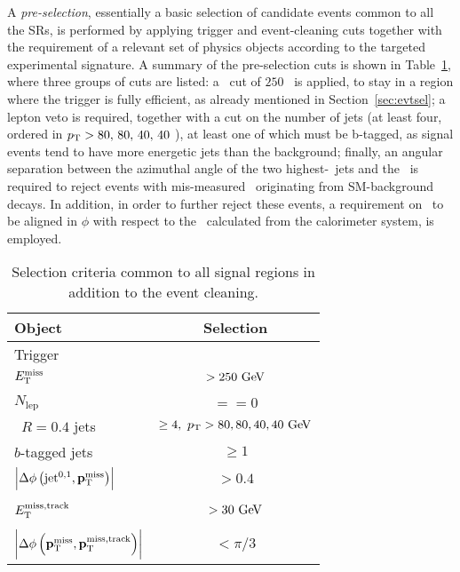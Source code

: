 			A \emph{pre-selection}, essentially a basic selection of candidate events common to all the \acp{SR}, is performed by applying trigger and event-cleaning cuts together with the requirement of a relevant set of physics objects according to the targeted experimental signature. A summary of the pre-selection cuts is shown in Table~\ref{tab:SRcommon}, where three groups of cuts are listed: a \met\ cut of $250$ \GeV\ is applied, to stay in a region where the trigger is fully efficient, as already mentioned in Section~\ref{sec:evtsel}; a lepton veto is required, together with a cut on the number of jets (at least four, ordered in $p_{\mathrm{T}} > 80,\,80,\,40,\,40$ \GeV), at least one of which must be b-tagged, as signal events tend to have more energetic jets than the background; finally, an angular separation between the azimuthal angle of the two highest-\pt\ jets and the \ptmiss\ is required to reject events with mis-measured \met\ originating from \ac{SM}-background decays. In addition, in order to further reject these events, a requirement on \ptmisstrk\ to be aligned in $\phi$ with respect to the \ptmiss\ calculated from the calorimeter system, is employed. 

			\begin{table}[htbp]
			\caption{Selection criteria common to all signal regions in addition to the event cleaning.}
				\begin{center}
				    \begin{tabular}{lc} 
				    	\toprule
				    	\textbf{Object} & \textbf{Selection} \\
				    	\toprule
				    	Trigger & \met \\ 
					    $E_{\mathrm{T}}^{\mathrm{miss}}$ & $> 250\GeV$ \\ 
					    & \\ [-2.5ex] \midrule
					    $N_{\mathrm{lep}}$ & $== 0$ \\ 
					    \antikt\ $R=0.4$ jets & $\ge 4,~\pt>80,80,40,40 \gev$ \\ 
					    $b$-tagged jets & $\ge1$ \\ \midrule
					    $\left|\Delta\phi\left(\mathrm{jet}^{0,1},\mathbf{p}_\mathrm{T}^\mathrm{miss}\right)\right|$ & $> 0.4$ \\ 
					    & \\ [-2.5ex] 
					    $E_{\mathrm{T}}^{\mathrm{miss, track}}$  & $> 30 \gev$ \\  
					    & \\ [-2.5ex] 
					    $\left|\Delta\phi\left(\mathbf{p}_\mathrm{T}^\mathrm{miss},\mathbf{p}_{\mathrm{T}}^{\mathrm{miss, track}}\right)\right|$ & $<\pi/3$ \\
					    \bottomrule
				    \end{tabular}
					\end{center}
			\label{tab:SRcommon}
			\end{table}

